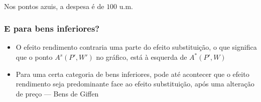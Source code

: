 \begin{frame}
\begin{center}
\\
			Nos pontos azuis, a despesa \'e de \(100\) u.m.
	\end{center}
\end{frame}

\begin{frame}
	\frametitle{E para bens inferiores?}
	\begin{itemize}
	\item O efeito rendimento contraria uma parte do efeito substitui\c c\~ao, o que significa que o ponto $A^s(P',W')$ no gr\'afico, est\'a \`a esquerda de $A^*(P',W)$
	\item Para uma certa categoria de bens inferiores, pode at\'e acontecer que o efeito rendimento seja predominante face ao efeito substitui\c c\~ao, ap\'os uma altera\c c\~ao de pre\c co --- Bens de Giffen
	\end{itemize}
\end{frame}

